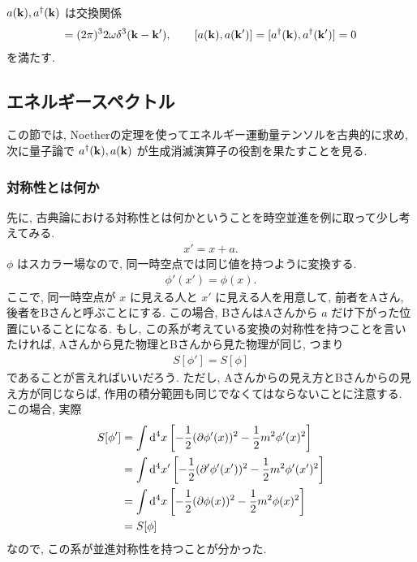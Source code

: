 \documentclass[../note01.tex]{subfiles}
\begin{document}
\begin{kekka}
    $ a(\vb{k}),a^\dagger(\vb{k}) $ は交換関係
    \begin{align}
        [a(\vb{k}),a^\dagger(\vb{k}')] = (2\pi)^3 2\omega\delta^3(\vb{k}-\vb{k}'),\qquad [a(\vb{k}),a(\vb{k}')]=[a^\dagger(\vb{k}),a^\dagger(\vb{k}')]=0
    \end{align}
    を満たす.
\end{kekka}

\subsection{エネルギースペクトル}
この節では, Noetherの定理を使ってエネルギー運動量テンソルを古典的に求め, 次に量子論で $ a^\dagger(\vb{k}),a(\vb{k}) $ が生成消滅演算子の役割を果たすことを見る.
\subsubsection{対称性とは何か}
先に, 古典論における対称性とは何かということを時空並進を例に取って少し考えてみる.
\begin{align}
    x' = x + a.
\end{align}
$ \phi $ はスカラー場なので, 同一時空点では同じ値を持つように変換する.
\begin{align}
    \phi'(x')=\phi(x).
\end{align}
ここで, 同一時空点が $ x $ に見える人と $ x' $ に見える人を用意して, 前者をAさん, 後者をBさんと呼ぶことにする.
この場合, BさんはAさんから $ a $ だけ下がった位置にいることになる.
もし, この系が考えている変換の対称性を持つことを言いたければ, Aさんから見た物理とBさんから見た物理が同じ, つまり
\begin{align}
    S[\phi'] = S[\phi]
\end{align}
であることが言えればいいだろう. ただし, Aさんからの見え方とBさんからの見え方が同じならば, 作用の積分範囲も同じでなくてはならないことに注意する. この場合, 実際
\begin{align*}
    S[\phi'] &= \int\dd[4]{x} \qty[-\frac{1}{2}(\partial\phi'(x))^2 - \frac{1}{2}m^2\phi'(x)^2] \\
    &= \int\dd[4]{x'} \qty[-\frac{1}{2}(\partial'\phi'(x'))^2 - \frac{1}{2}m^2\phi'(x')^2] \\
    &= \int\dd[4]{x} \qty[-\frac{1}{2}(\partial\phi(x))^2 - \frac{1}{2}m^2\phi(x)^2] \\
    &= S[\phi]
\end{align*}
なので, この系が並進対称性を持つことが分かった.
\end{document}
